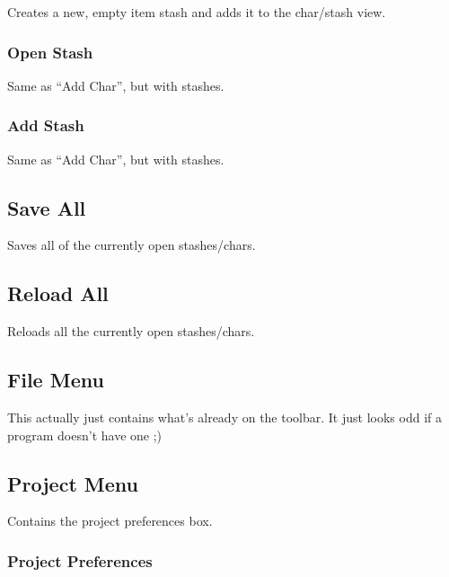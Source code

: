 \documentclass[a4paper,10pt]{article}
\begin{document}
Creates a new, empty item stash and adds it to the char/stash view.

\subsubsection{Open Stash}

Same as ``Add Char'', but with stashes. 

\subsubsection{Add Stash}

Same as ``Add Char'', but with stashes.

\subsection{Save All}

Saves all of the currently open stashes/chars.

\subsection{Reload All}

Reloads all the currently open stashes/chars.

\subsection{File Menu}

This actually just contains what's already on the toolbar. It just looks odd if a program doesn't have one ;)

\subsection{Project Menu}

Contains the project preferences box.

\subsubsection{Project Preferences}
\end{document}
